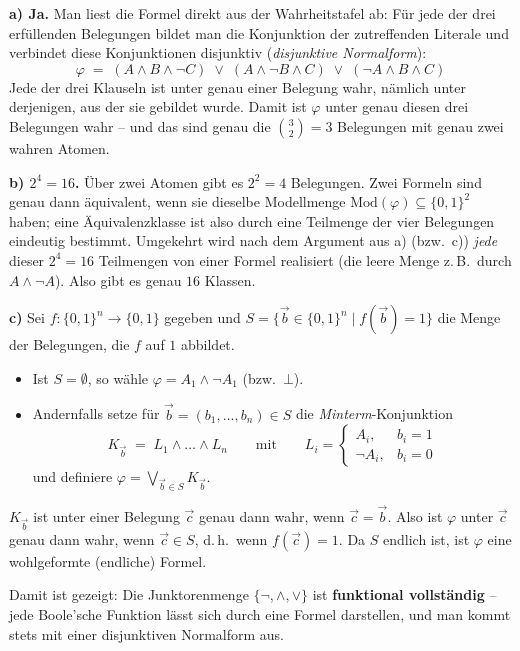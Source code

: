 \begin{loesung}
\textbf{a) Ja.} Man liest die Formel direkt aus der Wahrheitstafel ab: Für jede der drei erfüllenden Belegungen bildet man die Konjunktion der zutreffenden Literale und verbindet diese Konjunktionen disjunktiv (\emph{disjunktive Normalform}):
\[
  \varphi \;=\; (A\wedge B\wedge\neg C)\;\vee\;(A\wedge\neg B\wedge C)\;\vee\;(\neg A\wedge B\wedge C)
\]
Jede der drei Klauseln ist unter genau einer Belegung wahr, nämlich unter derjenigen, aus der sie gebildet wurde. Damit ist $\varphi$ unter genau diesen drei Belegungen wahr -- und das sind genau die $\binom{3}{2}=3$ Belegungen mit genau zwei wahren Atomen.

\textbf{b) $2^4 = 16$.} Über zwei Atomen gibt es $2^2=4$ Belegungen. Zwei Formeln sind genau dann äquivalent, wenn sie dieselbe Modellmenge $\mathrm{Mod}(\varphi)\subseteq\{0,1\}^2$ haben; eine Äquivalenzklasse ist also durch eine Teilmenge der vier Belegungen eindeutig bestimmt. Umgekehrt wird nach dem Argument aus a) (bzw.\ c)) \emph{jede} dieser $2^4=16$ Teilmengen von einer Formel realisiert (die leere Menge z.\,B.\ durch $A\wedge\neg A$). Also gibt es genau $16$ Klassen.

\textbf{c)} Sei $f:\{0,1\}^n\to\{0,1\}$ gegeben und $S=\{\vec{b}\in\{0,1\}^n \mid f(\vec{b})=1\}$ die Menge der Belegungen, die $f$ auf $1$ abbildet.
\begin{itemize}
  \item Ist $S=\emptyset$, so wähle $\varphi = A_1\wedge\neg A_1$ (bzw.\ $\bot$).
  \item Andernfalls setze für $\vec{b}=(b_1,\dots,b_n)\in S$ die \emph{Minterm}-Konjunktion
  \[
    K_{\vec{b}} \;=\; L_1 \wedge \dots \wedge L_n
    \qquad\text{mit}\qquad
    L_i = \begin{cases} A_i, & b_i = 1\\ \neg A_i, & b_i = 0\end{cases}
  \]
  und definiere $\varphi = \bigvee_{\vec{b}\in S} K_{\vec{b}}$.
\end{itemize}
$K_{\vec{b}}$ ist unter einer Belegung $\vec{c}$ genau dann wahr, wenn $\vec{c}=\vec{b}$. Also ist $\varphi$ unter $\vec{c}$ genau dann wahr, wenn $\vec{c}\in S$, d.\,h.\ wenn $f(\vec{c})=1$. Da $S$ endlich ist, ist $\varphi$ eine wohlgeformte (endliche) Formel.

Damit ist gezeigt: Die Junktorenmenge $\{\neg,\wedge,\vee\}$ ist \textbf{funktional vollständig} -- jede Boole'sche Funktion lässt sich durch eine Formel darstellen, und man kommt stets mit einer disjunktiven Normalform aus.
\end{loesung}

